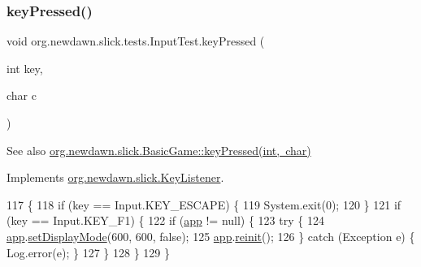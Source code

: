 \subsubsection{\texorpdfstring{key\+Pressed()}{keyPressed()}}
{\footnotesize\ttfamily void org.\+newdawn.\+slick.\+tests.\+Input\+Test.\+key\+Pressed (\begin{DoxyParamCaption}\item[{int}]{key,  }\item[{char}]{c }\end{DoxyParamCaption})\hspace{0.3cm}{\ttfamily [inline]}}

\begin{DoxySeeAlso}{See also}
\mbox{\hyperlink{classorg_1_1newdawn_1_1slick_1_1_basic_game_a4fbb3345b5abf5ddd54a99466d07f02f}{org.\+newdawn.\+slick.\+Basic\+Game\+::key\+Pressed(int, char)}} 
\end{DoxySeeAlso}


Implements \mbox{\hyperlink{interfaceorg_1_1newdawn_1_1slick_1_1_key_listener_ac0b0568a21ef486c4f51382614c196ef}{org.\+newdawn.\+slick.\+Key\+Listener}}.


\begin{DoxyCode}
117                                             \{
118         \textcolor{keywordflow}{if} (key == Input.KEY\_ESCAPE) \{
119             System.exit(0);
120         \}
121         \textcolor{keywordflow}{if} (key == Input.KEY\_F1) \{
122             \textcolor{keywordflow}{if} (\mbox{\hyperlink{classorg_1_1newdawn_1_1slick_1_1tests_1_1_input_test_a9f5c6e57ecc104f4baea82dcfc34106c}{app}} != null) \{
123                 \textcolor{keywordflow}{try} \{
124                     \mbox{\hyperlink{classorg_1_1newdawn_1_1slick_1_1tests_1_1_input_test_a9f5c6e57ecc104f4baea82dcfc34106c}{app}}.\mbox{\hyperlink{classorg_1_1newdawn_1_1slick_1_1_app_game_container_aa2de68db61ddd3917a8edc0177ebdfe3}{setDisplayMode}}(600, 600, \textcolor{keyword}{false});
125                     \mbox{\hyperlink{classorg_1_1newdawn_1_1slick_1_1tests_1_1_input_test_a9f5c6e57ecc104f4baea82dcfc34106c}{app}}.\mbox{\hyperlink{classorg_1_1newdawn_1_1slick_1_1_app_game_container_a1b0b230965ebebc9d4f43acf93986fd3}{reinit}}();
126                 \} \textcolor{keywordflow}{catch} (Exception e) \{ Log.error(e); \}
127             \}
128         \}
129     \}
\end{DoxyCode}
\mbox{\label{classorg_1_1newdawn_1_1slick_1_1tests_1_1_input_test_ae8aa9534b80812da81a5c10bfd10954c}} 
